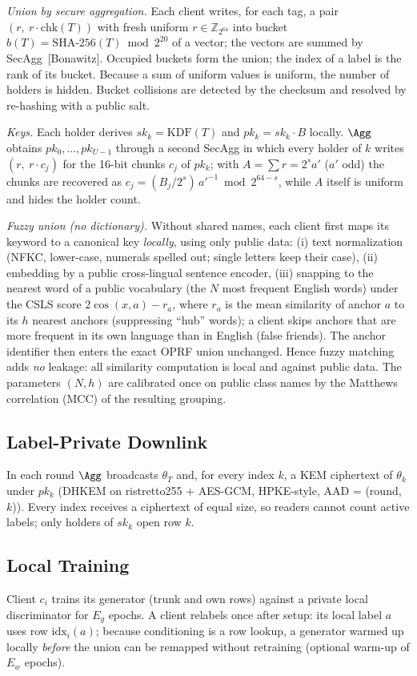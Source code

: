 \emph{Union by secure aggregation.} Each client writes, for each tag, a pair
$(r,\ r\cdot\mathrm{chk}(T))$ with fresh uniform $r\in\mathbb{Z}_{2^{64}}$ into bucket
$b(T)=\mathrm{SHA\text{-}256}(T)\bmod 2^{20}$ of a vector; the vectors are summed by SecAgg~[Bonawitz].
Occupied buckets form the union; the index of a label is the rank of its bucket. Because a sum of
uniform values is uniform, the number of holders is hidden. Bucket collisions are detected by the
checksum and resolved by re-hashing with a public salt.

\emph{Keys.} Each holder derives $sk_k=\mathrm{KDF}(T)$ and $pk_k=sk_k\cdot B$ locally. $\Agg$ obtains
$pk_0,\dots,pk_{U-1}$ through a second SecAgg in which every holder of $k$ writes
$(r,\ r\cdot c_j)$ for the 16-bit chunks $c_j$ of $pk_k$; with $A=\sum r=2^s a'$ ($a'$ odd) the
chunks are recovered as $c_j=(B_j/2^s)\,a'^{-1}\bmod 2^{64-s}$, while $A$ itself is uniform and
hides the holder count.

\emph{Fuzzy union (no dictionary).} Without shared names, each client first maps its keyword to a
canonical key \emph{locally}, using only public data: (i) text normalization (NFKC, lower-case,
numerals spelled out; single letters keep their case), (ii) embedding by a public cross-lingual
sentence encoder, (iii) snapping to the nearest word of a public vocabulary (the $N$ most frequent
English words) under the CSLS score $2\cos(x,a)-r_a$, where $r_a$ is the mean similarity of anchor $a$
to its $h$ nearest anchors (suppressing ``hub'' words); a client skips anchors that are more frequent
in its own language than in English (false friends). The anchor identifier then enters the exact
OPRF union unchanged. Hence fuzzy matching adds \emph{no} leakage: all similarity computation is local
and against public data. The parameters $(N,h)$ are calibrated once on public class names by the
Matthews correlation (MCC) of the resulting grouping.

\subsection{Label-Private Downlink}
In each round $\Agg$ broadcasts $\theta_T$ and, for every index $k$, a KEM ciphertext of $\theta_k$
under $pk_k$ (DHKEM on ristretto255 + AES-GCM, HPKE-style, AAD = (round, $k$)). Every index receives
a ciphertext of equal size, so readers cannot count active labels; only holders of $sk_k$ open row $k$.

\subsection{Local Training}
Client $c_i$ trains its generator (trunk and own rows) against a private local discriminator for $E_g$
epochs. A client relabels once after setup: its local label $a$ uses row $\mathrm{idx}_i(a)$; because
conditioning is a row lookup, a generator warmed up locally \emph{before} the union can be remapped
without retraining (optional warm-up of $E_w$ epochs).

